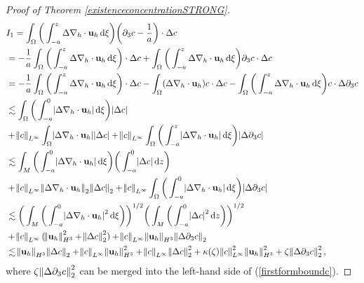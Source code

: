 \documentclass[11pt]{article}
\newcommand*\diff{\mathop{}\!\mathrm{d}}
\begin{document}
\begin{proof}[Proof of Theorem \ref{existenceconcentrationSTRONG}]
\begin{equation} \label{term3estimateGE_1}
\begin{split}
& I_1 = \int_\Omega \bigg ( \int_{-a}^z \Delta \nabla_h \cdot \mathbf{u}_h \diff \xi \bigg) \bigg ( \partial_3 c - \frac{1}{a}\bigg) \cdot \Delta c \\
& = - \frac{1}{a} \int_\Omega \bigg ( \int_{-a}^z \Delta \nabla_h \cdot \mathbf{u}_h \diff \xi \bigg) \cdot \Delta c + \int_\Omega \bigg ( \int_{-a}^z \Delta \nabla_h \cdot \mathbf{u}_h \diff \xi \bigg) \partial_3 c \cdot \Delta c \\
& = - \frac{1}{a} \int_\Omega \bigg ( \int_{-a}^z \Delta \nabla_h \cdot \mathbf{u}_h \diff \xi \bigg) \cdot \Delta c - \int_\Omega (\Delta \nabla_h \cdot \mathbf{u}_h) c \cdot \Delta c - \int_\Omega \bigg ( \int_{-a}^z \Delta \nabla_h \cdot \mathbf{u}_h \diff \xi \bigg) c \cdot \Delta \partial_3 c \\
& \lesssim \int_\Omega \bigg ( \int_{-a}^0 \abs{\Delta \nabla_h \cdot \mathbf{u}_h} \diff \xi \bigg) \abs{\Delta c} \\
& + \norm{c}_{L^\infty} \int_\Omega \abs{\Delta \nabla_h \cdot \mathbf{u}_h} \abs{\Delta c} + \norm{c}_{L^\infty} \int_\Omega \bigg ( \int_{-a}^z \abs{ \Delta \nabla_h \cdot \mathbf{u}_h} \diff \xi \bigg) \abs{\Delta \partial_3 c} \\
& \lesssim \int_M \bigg ( \int_{-a}^0 \abs{\Delta \nabla_h \cdot \mathbf{u}_h} \diff \xi \bigg) \bigg ( \int_{-a}^0 \abs{\Delta c} \diff z \bigg ) \\
& + \norm{c}_{L^\infty} \norm{\Delta \nabla_h \cdot \mathbf{u}_h}_2 \norm{\Delta c}_2 + \norm{c}_{L^\infty} \int_\Omega \bigg ( \int_{-a}^0 \abs{ \Delta \nabla_h \cdot \mathbf{u}_h} \diff \xi \bigg) \abs{\Delta \partial_3 c} \\
& \lesssim \bigg ( \int_M \bigg ( \int_{-a}^0 \abs{\Delta \nabla_h \cdot \mathbf{u}_h}^2 \diff \xi \bigg) \bigg )^{1/2} \bigg ( \int_M \bigg ( \int_{-a}^0 \abs{\Delta c}^2 \diff z \bigg ) \bigg )^{1/2} \\
& + \norm{c}_{L^\infty} (\norm{\mathbf{u}_h}_{H^3}^2 + \norm{\Delta c}_2^2) + \norm{c}_{L^\infty} \norm{\mathbf{u}_h}_{H^3} \norm{\Delta \partial_3 c}_2 \\
& \lesssim \norm{\mathbf{u}_h}_{H^3} \norm{\Delta c}_2 + \norm{c}_{L^\infty} \norm{\mathbf{u}_h}_{H^3}^2 + \norm{c}_{L^\infty} \norm{\Delta c}_2^2 + \kappa(\zeta) \norm{c}_{L^\infty}^2 \norm{\mathbf{u}_h}_{H^3}^2 + \zeta \norm{\Delta \partial_3 c}_2^2, \raisetag{60pt} \\
\end{split}
\end{equation}
%
where $ \zeta \norm{\Delta \partial_3 c}_2^2$ can be merged into the left-hand side of (\ref{firstformboundc}).


\end{proof}
\end{document}
